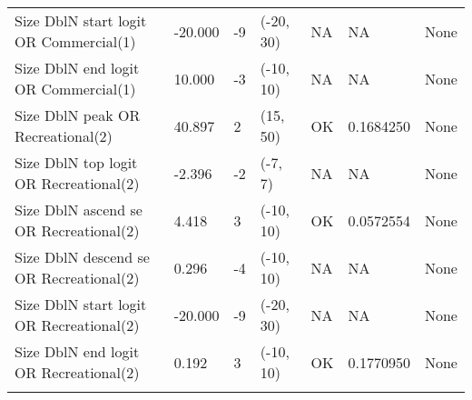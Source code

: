 \documentclass[11pt,
  english,
  a4paper,
]{article}
\begin{document}
\begin{landscape}
\begin{longtable}[t]{>{\raggedright\arraybackslash}p{6cm}lllll>{\raggedright\arraybackslash}p{4cm}}
Size DblN start logit OR Commercial(1) & -20.000 & -9 & (-20, 30) & NA & NA & None\\
Size DblN end logit OR Commercial(1) & 10.000 & -3 & (-10, 10) & NA & NA & None\\
Size DblN peak OR Recreational(2) & 40.897 & 2 & (15, 50) & OK & 0.1684250 & None\\
Size DblN top logit OR Recreational(2) & -2.396 & -2 & (-7, 7) & NA & NA & None\\
Size DblN ascend se OR Recreational(2) & 4.418 & 3 & (-10, 10) & OK & 0.0572554 & None\\
Size DblN descend se OR Recreational(2) & 0.296 & -4 & (-10, 10) & NA & NA & None\\
Size DblN start logit OR Recreational(2) & -20.000 & -9 & (-20, 30) & NA & NA & None\\
Size DblN end logit OR Recreational(2) & 0.192 & 3 & (-10, 10) & OK & 0.1770950 & None\\*
\end{longtable}
\leavevmode\tagmcend\tagstructend\par
\endgroup{}
\end{landscape}
\endgroup{}



\begingroup\fontsize{10}{12}\selectfont
\begingroup\fontsize{10}{12}\selectfont
\end{document}
